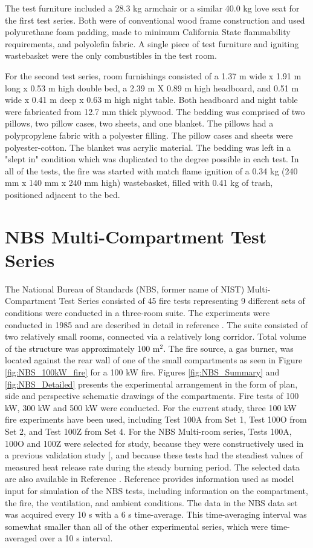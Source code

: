 The test furniture included a 28.3 kg armchair or a similar 40.0 kg love seat for the first test series. Both were of conventional wood frame construction and used polyurethane foam padding, made to minimum California State flammability requirements, and polyolefin fabric. A single piece of test furniture and igniting wastebasket were the only combustibles in the test room.

For the second test series, room furnishings consisted of a 1.37 m wide x 1.91 m long x 0.53 m high double bed, a 2.39 m X 0.89 m high headboard, and 0.51 m wide x 0.41 m deep x 0.63 m high night table. Both headboard and night table were fabricated from 12.7 mm thick plywood. The bedding was comprised of two pillows, two pillow cases, two sheets, and one blanket. The pillows had a polypropylene fabric with a polyester filling. The pillow cases and sheets were polyester-cotton. The blanket was acrylic material. The bedding was left in a "slept in" condition which was duplicated to the degree possible in each test. In all of the tests, the fire was started with match flame ignition of a 0.34 kg (240 mm x 140 mm x 240 mm high) wastebasket, filled with 0.41 kg of trash, positioned adjacent to the bed.

\section{NBS Multi-Compartment Test Series}

The National Bureau of Standards (NBS, former name of NIST) Multi-Compartment Test Series consisted of 45 fire tests representing 9 different sets of conditions were conducted in a three-room suite.  The experiments were conducted in 1985 and are described in detail in reference \cite{Peacock:1988}.  The suite consisted of two relatively small rooms, connected via a relatively long corridor. Total volume of the structure was approximately 100 m$^2$. The fire source, a gas burner, was located against the rear wall of one of the small compartments as seen in Figure \ref{fig:NBS_100kW_fire} for a 100 kW fire.  Figures \ref{fig:NBS_Summary} and \ref{fig:NBS_Detailed} presents the experimental arrangement in the form of plan, side and perspective schematic drawings of the compartments. Fire tests of 100 kW, 300 kW and 500 kW were conducted. For the current  study, three 100 kW fire experiments have been used, including Test 100A from Set 1, Test 100O from Set 2, and Test 100Z from Set 4. For the NBS Multi-room series, Tests 100A, 100O and 100Z were selected for study, because they were constructively used in a previous validation study [\cite{EPRI}, and because these tests had  the steadiest values of measured heat release rate during the steady burning period. The selected data are also available in Reference \cite{EPRI}.   Reference \cite{NRCNUREG1824} provides information used as model input for simulation of the NBS tests, including information on the compartment, the fire, the ventilation, and ambient conditions. The data in the NBS data set was acquired every 10 s with a 6 s time-average.  This time-averaging interval was somewhat smaller than all of the other experimental series, which were time-averaged over a 10 s interval.

